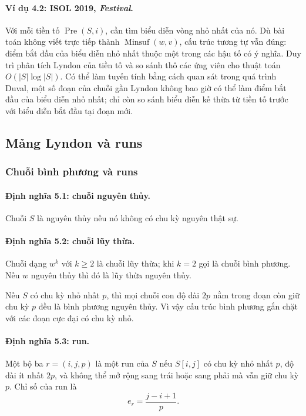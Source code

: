 \documentclass[11pt]{article}
\begin{document}
\paragraph{Ví dụ 4.2: ISOL 2019, \emph{Festival}.}
Với mỗi tiền tố $\operatorname{Pre}(S,i)$, cần tìm biểu diễn vòng nhỏ nhất của
nó. Dù bài toán không viết trực tiếp thành $\operatorname{Minsuf}(w,v)$, cấu trúc
tương tự vẫn đúng: điểm bắt đầu của biểu diễn nhỏ nhất thuộc một trong các hậu
tố có ý nghĩa. Duy trì phân tích Lyndon của tiền tố và so sánh thô các ứng viên
cho thuật toán $O(|S|\log |S|)$. Có thể làm tuyến tính bằng cách quan sát trong
quá trình Duval, một số đoạn của chuỗi gần Lyndon không bao giờ có thể làm điểm
bắt đầu của biểu diễn nhỏ nhất; chỉ còn so sánh biểu diễn kế thừa từ tiền tố
trước với biểu diễn bắt đầu tại đoạn mới.

\subsection{Mảng Lyndon và runs}

\subsubsection{Chuỗi bình phương và runs}

\paragraph{Định nghĩa 5.1: chuỗi nguyên thủy.}
Chuỗi $S$ là nguyên thủy nếu nó không có chu kỳ nguyên thật sự.

\paragraph{Định nghĩa 5.2: chuỗi lũy thừa.}
Chuỗi dạng $w^k$ với $k\ge 2$ là chuỗi lũy thừa; khi $k=2$ gọi là chuỗi bình
phương. Nếu $w$ nguyên thủy thì đó là lũy thừa nguyên thủy.

Nếu $S$ có chu kỳ nhỏ nhất $p$, thì mọi chuỗi con độ dài $2p$ nằm trong đoạn còn
giữ chu kỳ $p$ đều là bình phương nguyên thủy. Vì vậy cấu trúc bình phương gắn
chặt với các đoạn cực đại có chu kỳ nhỏ.

\paragraph{Định nghĩa 5.3: run.}
Một bộ ba $r=(i,j,p)$ là một run của $S$ nếu $S[i,j]$ có chu kỳ nhỏ nhất $p$,
độ dài ít nhất $2p$, và không thể mở rộng sang trái hoặc sang phải mà vẫn giữ
chu kỳ $p$. Chỉ số của run là
\[
  e_r=\frac{j-i+1}{p}.
\]
\end{document}
